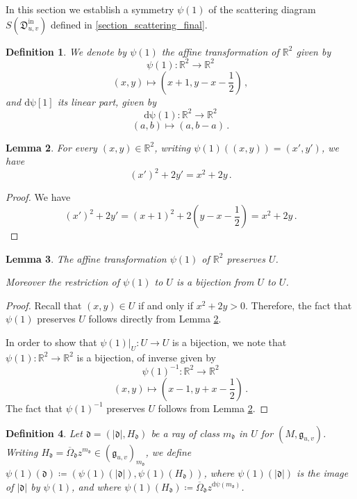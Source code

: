 \documentclass[12pt, a4paper]{amsart}
\newtheorem{defn}{Definition}[section]
\newtheorem{lem}[defn]{Lemma}
\newcommand\R{\mathbb R}
\newcommand\fd{\mathfrak d}
\newcommand\fD{\mathfrak D}
\newcommand\fg{\mathfrak g}
\newcommand\iin{\mathrm{in}}
\begin{document}
In this section we establish a symmetry 
$\psi(1)$ of the scattering diagram 
$S(\fD^\iin_{u,v})$ defined in
\cref{section_scattering_final}.


\begin{defn} \label{def_psi(1)}
We denote by $\psi(1)$ the affine transformation of $\R^2$ given by
\[ \psi(1) \colon \R^2 \rightarrow \R^2\]
\[ (x,y) \mapsto \left(x+1, y-x-\frac{1}{2}\right)\,,\]
and $\mathrm{d \psi}[1]$ its linear part,
given by 
\[ \mathrm{d \psi}(1) \colon 
\R^2 \rightarrow \R^2\]
\[ (a,b) \mapsto (a,b-a) \,.\]
\end{defn}

\begin{lem} \label{lem_computation}
For every $(x,y) \in \R^2$, writing 
$\psi(1)((x,y))=(x',y')$, we have 
\[ (x')^2+2y'=x^2+2y\,.\]
\end{lem}

\begin{proof}
We have 
\[ (x')^2+2y'=(x+1)^2
+2 (y-x-\frac{1}{2})=x^2+2y\,.\]
\end{proof}

\begin{lem} \label{lem_preserv_U}
The affine transformation $\psi(1)$ of 
$\R^2$ preserves $U$.

Moreover the restriction of $\psi(1)$ to $U$ is a
bijection from $U$ to $U$.
\end{lem}

\begin{proof}
Recall that $(x,y) \in U$ if and only if 
$x^2+2y>0$. Therefore, the fact that $\psi(1)$ preserves $U$ follows directly from 
Lemma \ref{lem_computation}.

In order to show that 
$\psi(1)|_U \colon U \rightarrow U$ is a bijection, we note that 
$\psi(1) \colon \R^2 \rightarrow \R^2$ is a bijection, of inverse given by 
\[ \psi(1)^{-1} \colon 
\R^2 \rightarrow \R^2\]
\[(x,y) \mapsto (x-1, y+x-\frac{1}{2})\,.\]
The fact that $\psi(1)^{-1}$ preserves $U$
follows from Lemma
\ref{lem_computation}.
\end{proof}

\begin{defn}
Let $\fd=(|\fd|, H_\fd)$ be a ray of class 
$m_\fd$ in $U$ for
$(M,\fg_{u,v})$.
Writing $H_\fd=\overline{\Omega}_\fd z^{m_\fd} \in (\fg_{u,v})_{m_\fd}$, we define 
$\psi(1)(\fd) \coloneq
(\psi(1)(|\fd|), \psi(1)(H_\fd))$,
where 
$\psi(1)(|\fd|)$ is the image of $|\fd|$
by $\psi(1)$, and where 
$\psi(1)(H_\fd) \coloneq \overline{\Omega}_\fd z^{\mathrm{d\psi}(m_\fd)}$.
\end{defn}
\end{document}
